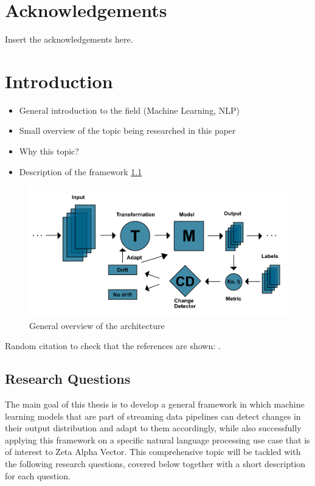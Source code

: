 \documentclass[12pt]{report}
\begin{document}
\chapter*{Acknowledgements}

Insert the acknowledgements here.

\tableofcontents

\listoffigures

\listoftables

\chapter{Introduction}

\begin{itemize}
    \item General introduction to the field (Machine Learning, NLP)
    \item Small overview of the topic being researched in this paper
    \item Why this topic?
    \item Description of the framework \ref{fig:framework}
\end{itemize}

\begin{figure}[h!]
\centering
\includegraphics[width=\linewidth]{assets/introduction/framework.png}
\caption{General overview of the architecture}
\label{fig:framework}
\end{figure}

Random citation to check that the references are shown: \citep{Heng_Wang_2015}.

\section{Research Questions}

The main goal of this thesis is to develop a general framework in which machine learning models that are part of streaming data pipelines can detect changes in their output distribution and adapt to them accordingly, while also successfully applying this framework on a specific natural language processing use case that is of interest to Zeta Alpha Vector. This comprehensive topic will be tackled with the following research questions, covered below together with a short description for each question.
\end{document}
